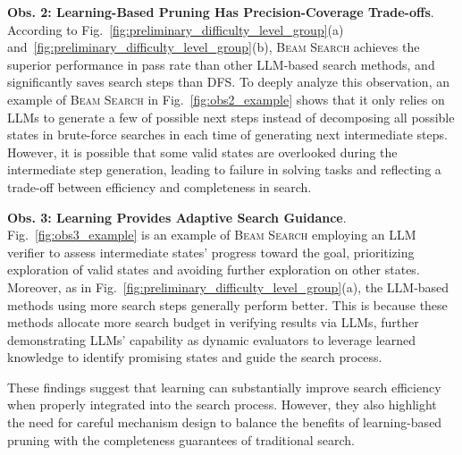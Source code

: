 \noindent \textbf{Obs. 2: Learning-Based Pruning Has Precision-Coverage Trade-offs}. According to Fig.~\ref{fig:preliminary_difficulty_level_group}(a) and~\ref{fig:preliminary_difficulty_level_group}(b), \textsc{Beam Search} achieves the superior performance in pass rate than other LLM-based search methods, and significantly saves search steps than \textsc{DFS}. To deeply analyze this observation, an example of \textsc{Beam Search} in Fig.~\ref{fig:obs2_example} shows that it only relies on LLMs to generate a few of possible next steps instead of decomposing all possible states in brute-force searches in each time of generating next intermediate steps. However, it is possible that some valid states are overlooked during the intermediate step generation, leading to failure in solving tasks and reflecting a trade-off between efficiency and completeness in search.


\noindent \textbf{Obs. 3: Learning Provides Adaptive Search Guidance}. 
Fig.~\ref{fig:obs3_example} is an example of \textsc{Beam Search} employing an LLM verifier to assess intermediate states' progress toward the goal, prioritizing exploration of valid states and avoiding further exploration on other states. Moreover,
as in Fig.~\ref{fig:preliminary_difficulty_level_group}(a), the LLM-based methods using more search steps generally perform better. This is because these methods allocate more search budget in verifying results via LLMs, further demonstrating LLMs' capability as dynamic evaluators to leverage learned knowledge to identify promising states and guide the search process. 




These findings suggest that learning can substantially improve search efficiency when properly integrated into the search process. However, they also highlight the need for careful mechanism design to balance the benefits of learning-based pruning with the completeness guarantees of traditional search. 



